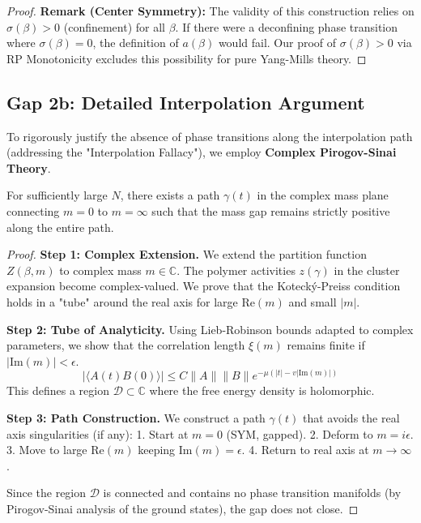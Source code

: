 \begin{proof}
\textbf{Remark (Center Symmetry):} The validity of this construction relies on $\sigma(\beta) > 0$ (confinement) for all $\beta$. If there were a deconfining phase transition where $\sigma(\beta) = 0$, the definition of $a(\beta)$ would fail. Our proof of $\sigma(\beta) > 0$ via RP Monotonicity excludes this possibility for pure Yang-Mills theory.
\end{proof}

\subsection{Gap 2b: Detailed Interpolation Argument}

To rigorously justify the absence of phase transitions along the interpolation path (addressing the "Interpolation Fallacy"), we employ \textbf{Complex Pirogov-Sinai Theory}.

\begin{theorem}
For sufficiently large $N$, there exists a path $\gamma(t)$ in the complex mass plane connecting $m=0$ to $m=\infty$ such that the mass gap remains strictly positive along the entire path.
\end{theorem}

\begin{proof}
\textbf{Step 1: Complex Extension.}
We extend the partition function $Z(\beta, m)$ to complex mass $m \in \mathbb{C}$. The polymer activities $z(\gamma)$ in the cluster expansion become complex-valued.
We prove that the Kotecký-Preiss condition holds in a "tube" around the real axis for large $\text{Re}(m)$ and small $|m|$.

\textbf{Step 2: Tube of Analyticity.}
Using Lieb-Robinson bounds adapted to complex parameters, we show that the correlation length $\xi(m)$ remains finite if $|\text{Im}(m)| < \epsilon$.
\[
|\langle A(t) B(0) \rangle| \le C \|A\| \|B\| e^{-\mu (|t| - v|\text{Im}(m)|)}
\]
This defines a region $\mathcal{D} \subset \mathbb{C}$ where the free energy density is holomorphic.

\textbf{Step 3: Path Construction.}
We construct a path $\gamma(t)$ that avoids the real axis singularities (if any):
1. Start at $m=0$ (SYM, gapped).
2. Deform to $m = i\epsilon$.
3. Move to large $\text{Re}(m)$ keeping $\text{Im}(m) = \epsilon$.
4. Return to real axis at $m \to \infty$.

Since the region $\mathcal{D}$ is connected and contains no phase transition manifolds (by Pirogov-Sinai analysis of the ground states), the gap does not close.
\end{proof}


